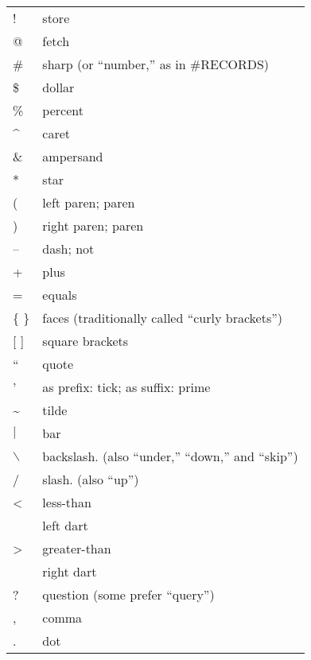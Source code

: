 {\small\begin{tabular}{ll}
{}{\setlength{\parsep}{0cm}}
!&store\\
@&fetch\\
\#&sharp (or ``number,'' as in \#RECORDS)\\
\$&dollar\\
\%&percent\\
\^{ }&caret\\
\&&ampersand\\
{*}&star\\
(&left paren; paren\\
)&right paren; paren\\
--&dash; not\\
+&plus\\
=&equals\\
\{ \}&faces (traditionally called ``curly brackets'')\\
{[} {]}&square brackets\\
``&quote\\
'&as prefix: tick; as suffix: prime\\
\~{ }&tilde\\
\(|\)&bar\\
\(\backslash\)&backslash. (also ``under,'' ``down,'' and ``skip'')\\
/&slash. (also ``up'')\\
<&less-than\\
 &left dart\\
>&greater-than\\
 &right dart\\
?&question (some prefer ``query'')\\
,&comma\\
.&dot\\
\end{tabular}}

